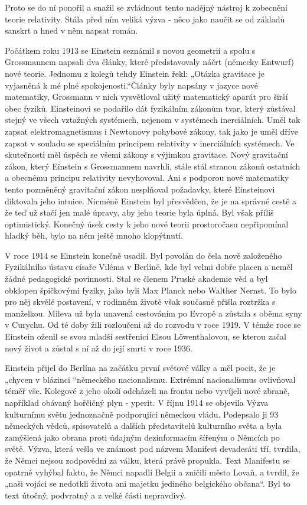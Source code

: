   Proto se do ní ponořil a snažil se zvládnout tento nadějný nástroj k zobecnění teorie relativity.
  Stála před ním veliká výzva - něco jako naučit se od základů sanskrt a hned v něm napsat román.
  
  Počátkem roku 1913 se Einstein seznámil s novou geometrií a spolu s Grossmannem napsali dva
  články, které představovaly náčrt (německy Entwurf) nové teorie. Jednomu z kolegů tehdy Einstein
  řekl: „Otázka gravitace je vyjasněná k mé plné spokojenosti.“Články byly napsány v jazyce nové
  matematiky, Grossmann v nich vysvětloval užitý matematický aparát pro širší obec fyziků.
  Einsteinovi se podařilo dát fyzikálním zákonům tvar, který zůstával stejný ve všech vztažných
  systémech, nejenom v systémech inerciálních. Uměl tak zapsat elektromagnetismus i Newtonovy
  pohybové zákony, tak jako je uměl dříve zapsat v souladu se speciálním principem relativity v
  inerciálních systémech. Ve skutečnosti měl úspěch se všemi zákony s výjimkou gravitace. Nový
  gravitační zákon, který Einstein s Grossmannem navrhli, stále stál stranou zákonů ostatních a
  obecnému principu relativity nevyhovoval. Ani s podporou nové matematiky tento pozměněný
  gravitační zákon nesplňoval požadavky, které Einsteinovi diktovala jeho intuice. Nicméně Einstein
  byl přesvědčen, že je na správné cestě a že teď už stačí jen malé úpravy, aby jeho teorie byla
  úplná. Byl však příliš optimistický. Konečný úsek cesty k jeho nové teorii prostoročasu
  nepřipomínal hladký běh, bylo na něm ještě mnoho klopýtnutí. 
  
  V roce 1914 se Einstein konečně usadil. Byl povolán do čela nově založeného Fyzikálního ústavu
  císaře Viléma v Berlíně, kde byl velmi dobře placen a neměl žádné pedagogické povinnosti. Stal se
  členem Pruské akademie věd a byl obklopen špičkovými fyziky, jako byli Max Planck nebo Walther
  Nernst. To bylo pro něj skvělé postavení, v rodinném životě však současně přišla roztržka s
  manželkou. Mileva už byla unavená cestováním po Evropě a zůstala s oběma syny v Curychu. Od té
  doby žili rozloučeni až do rozvodu v roce 1919. V témže roce se Einstein oženil se svou mladší
  sestřenicí Elsou Löwenthalovou, se kterou začal nový život a zůstal s ní až do její smrti v roce
  1936. 
  
  Einstein přijel do Berlína na začátku první světové války a měl pocit, že je „chycen v blázinci
  “německého nacionalismu. Extrémní nacionalismus ovlivňoval téměř vše. Kolegové z jeho okolí
  odcházeli na frontu nebo vyvíjeli nové zbraně, například obávaný hořčičný plyn - yperit. V říjnu
  1914 se objevila Výzva kulturnímu světu jednoznačně podporující německou vládu. Podepsalo ji 93
  německých vědců, spisovatelů a dalších představitelů kulturního světa a byla zamýšlená jako obrana
  proti údajným dezinformacím šířeným o Němcích po světě. Výzva, která vešla ve známost pod názvem
  Manifest devadesáti tří, tvrdila, že Němci nejsou zodpovědní za válku, která právě propukla. Text
  Manifestu se opatrně vyhýbal faktu, že Němci napadli Belgii a zničili město Lovaň, a tvrdil, že
  „naši vojáci se nedotkli života ani majetku jediného belgického občana“. Byl to text útočný,
  podvratný a z velké části nepravdivý. 
  
